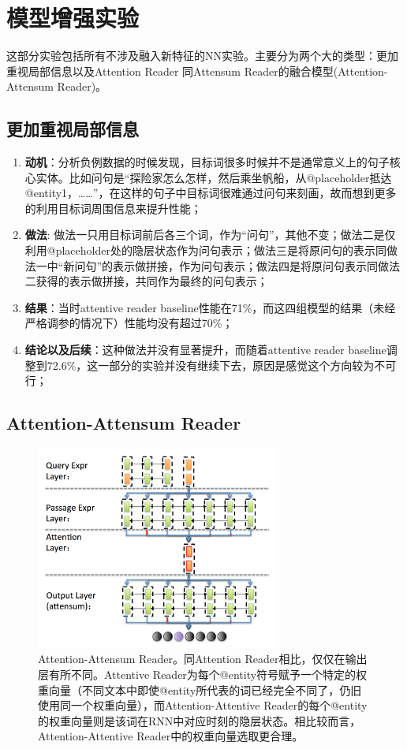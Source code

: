 \documentclass[11pt]{article}
\begin{document}
\section{模型增强实验}
这部分实验包括所有不涉及融入新特征的NN实验。主要分为两个大的类型：更加重视局部信息以及Attention Reader 同Attensum Reader的融合模型(Attention-Attensum Reader)。
\subsection{更加重视局部信息}
\begin{enumerate}
    \item {\bf 动机}：分析负例数据的时候发现，目标词很多时候并不是通常意义上的句子核心实体。比如问句是“探险家怎么怎样，然后乘坐帆船，从@placeholder抵达@entity1，……”，在这样的句子中目标词很难通过问句来刻画，故而想到更多的利用目标词周围信息来提升性能；
    \item  {\bf 做法}: 做法一只用目标词前后各三个词，作为“问句”，其他不变；做法二是仅利用@placeholder处的隐层状态作为问句表示；做法三是将原问句的表示同做法一中“新问句”的表示做拼接，作为问句表示；做法四是将原问句表示同做法二获得的表示做拼接，共同作为最终的问句表示；
    \item  {\bf  结果}：当时attentive reader baseline性能在71\%，而这四组模型的结果（未经严格调参的情况下）性能均没有超过70\%；
    \item  {\bf  结论以及后续}：这种做法并没有显著提升，而随着attentive reader baseline调整到72.6\%，这一部分的实验并没有继续下去，原因是感觉这个方向较为不可行；
\end{enumerate}

\subsection{Attention-Attensum Reader}
\begin{figure}[htbp]
\begin{center}
	\includegraphics[width=80mm]{picture/attention_attensum.PNG}
	\caption{Attention-Attensum Reader。同Attention Reader相比，仅仅在输出层有所不同。Attentive Reader为每个@entity符号赋予一个特定的权重向量（不同文本中即使@entity所代表的词已经完全不同了，仍旧使用同一个权重向量），而Attention-Attentive Reader的每个@entity的权重向量则是该词在RNN中对应时刻的隐层状态。相比较而言，Attention-Attentive Reader中的权重向量选取更合理。}
	\label{fig:3}
\end{center}
\end{figure}
\end{document}
